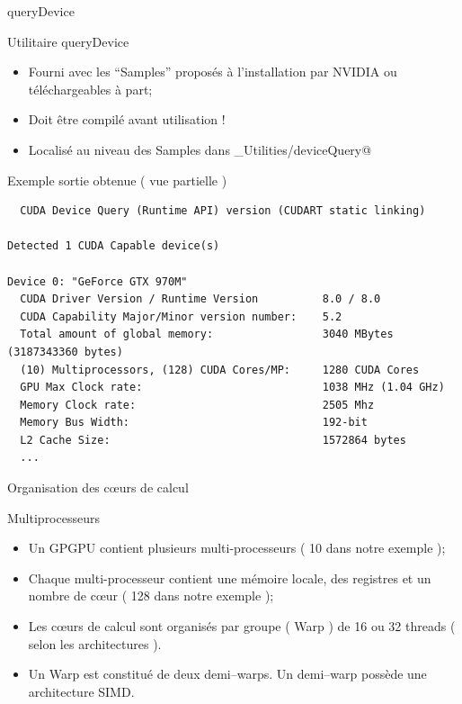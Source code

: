 \documentclass[handout,francais]{beamer}
\begin{document}
\begin{frame}[fragile]{queryDevice}
 \scriptsize
 \begin{block}{Utilitaire queryDevice}
  \begin{itemize}
   \item Fourni avec les ``Samples'' proposés à l'installation par NVIDIA
   ou téléchargeables à part;
   \item Doit être compilé avant utilisation !
   \item Localisé au niveau des Samples dans _Utilities/deviceQuery@
  \end{itemize}
 \end{block}
 
 \begin{block}{Exemple sortie obtenue ( vue partielle )}
 \begin{verbatim}
  CUDA Device Query (Runtime API) version (CUDART static linking)

Detected 1 CUDA Capable device(s)

Device 0: "GeForce GTX 970M"
  CUDA Driver Version / Runtime Version          8.0 / 8.0
  CUDA Capability Major/Minor version number:    5.2
  Total amount of global memory:                 3040 MBytes (3187343360 bytes)
  (10) Multiprocessors, (128) CUDA Cores/MP:     1280 CUDA Cores
  GPU Max Clock rate:                            1038 MHz (1.04 GHz)
  Memory Clock rate:                             2505 Mhz
  Memory Bus Width:                              192-bit
  L2 Cache Size:                                 1572864 bytes
  ...
  \end{verbatim}
 \end{block}
\end{frame}

\begin{frame}[fragile]{Organisation des c{\oe}urs de calcul}
 \begin{block}{Multiprocesseurs}
  \begin{itemize}
   \item Un GPGPU contient plusieurs multi-processeurs ( 10 dans notre exemple );
   \item Chaque multi-processeur contient une mémoire locale, des registres
   et un nombre de c{\oe}ur ( 128 dans notre exemple );
   \item Les c{\oe}urs de calcul sont organisés par groupe ( Warp ) de 16 ou
   32 threads ( selon les architectures ).
   \item Un Warp est constitué de deux demi--warps. Un demi--warp possède une architecture
   SIMD.
  \end{itemize}

 \end{block}

\end{frame}
\end{document}
